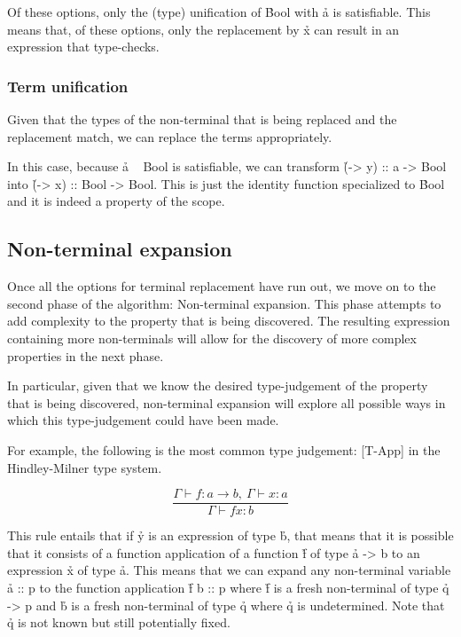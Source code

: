 \documentclass[a4paper, 11pt, onepage]{article}
\begin{document}
Of these options, only the (type) unification of \h{Bool} with \h{a} is satisfiable.
This means that, of these options, only the replacement by \h{x} can result in an expression that type-checks.


\subsubsection{Term unification}

Given that the types of the non-terminal that is being replaced and the replacement match, we can replace the terms appropriately.

In this case, because \h{a ~ Bool} is satisfiable, we can transform \h{(\x -> y) :: a -> Bool} into \h{(\x -> x) :: Bool -> Bool}.
This is just the identity function specialized to \h{Bool} and it is indeed a property of the scope.


\subsection{Non-terminal expansion}

Once all the options for terminal replacement have run out, we move on to the second phase of the algorithm: Non-terminal expansion.
This phase attempts to add complexity to the property that is being discovered.
The resulting expression containing more non-terminals will allow for the discovery of more complex properties in the next phase.

In particular, given that we know the desired type-judgement of the property that is being discovered,
non-terminal expansion will explore all possible ways in which this type-judgement could have been made.

For example, the following is the most common type judgement:
[T-App] in the Hindley-Milner type system. \cite{HM}

\[
  \frac{\Gamma \vdash f : a \rightarrow b,\ \Gamma \vdash x : a}{\Gamma \vdash f x : b}
\]

This rule entails that if \h{y} is an expression of type \h{b}, that means that it is possible that it consists of a function application of a function \h{f} of type \h{a -> b} to an expression \h{x} of type \h{a}.
This means that we can expand any non-terminal variable \h{a :: p} to the function application \h{f b :: p} where \h{f} is a fresh non-terminal of type \h{q -> p} and \h{b} is a fresh non-terminal of type \h{q} where \h{q} is undetermined.
Note that \h{q} is not known but still potentially fixed.
\end{document}
